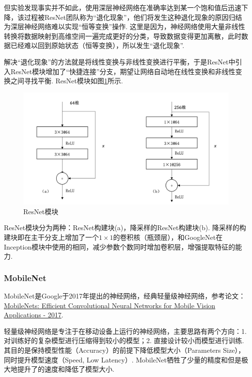 \documentclass[12pt, a4paper, oneside]{ctexart}
\numberwithin{equation}{section}  %
\begin{document}
但实验发现事实并不如此，使用深层神经网络在准确率达到某一个饱和值后迅速下降，该过程被ResNet团队称为“退化现象”，他们将发生这种退化现象的原因归结为深层神经网络难以实现“恒等变换”操作. 这里是因为，神经网络使用大量非线性转换将数据映射到高维空间一遍完成更好的分类，导致数据变得更加离散，此时数据已经难以回到原始状态（恒等变换），所以发生“退化现象”.

解决“退化现象”的方法就是将线性变换与非线性变换进行平衡，于是ResNet中引入ResNet模块增加了“快捷连接”分支，期望让网络自动地在线性变换和非线性变换之间寻找平衡. ResNet模块如图\ref{fig-ResNet}所示.
\begin{figure}[htbp]
  \centering
  \includegraphics[scale=0.8]{ResNet模块.png}
  \caption{ResNet模块}
  \label{fig-ResNet}
\end{figure}

ResNet模块分为两种：ResNet构建块(a)，降采样的ResNet构建块(b). 降采样的构建块即在主干分支上增加了一个$1\times 1$的卷积核（瓶颈层），和GoogleNet在Inception模块中使用的相同，减少参数个数同时增加卷积层，增强提取特征的能力.

\subsubsection{MobileNet}
MobileNet是Google于2017年提出的神经网络，经典轻量级神经网络，参考论文：\href{https://arxiv.org/pdf/1704.04861.pdf}{MobileNets: Efficient Convolutional Neural Networks for Mobile Vision Applications - 2017}.

轻量级神经网络是专注于在移动设备上运行的神经网络，主要思路有两个方向：1. 对训练好的复杂模型进行压缩得到较小的模型；2. 直接设计较小而模型进行训练. 其目的是保持模型性能（Accuracy）的前提下降低模型大小（Parameters Size），同时提升模型速度（Speed, Low Latency）. MobileNet牺牲了少量的精度和但是极大地提升了的速度和降低了模型大小.
\end{document}
